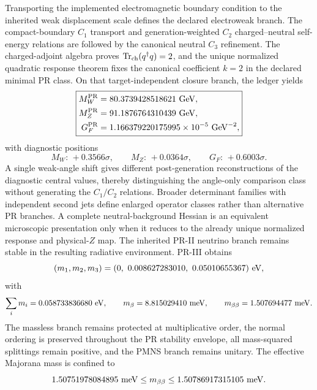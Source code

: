 \documentclass[11pt]{article}
\begin{document}
Transporting the implemented electromagnetic boundary condition to the
inherited weak displacement scale defines the declared electroweak branch.
The compact-boundary \(C_1\) transport and generation-weighted \(C_2\)
charged--neutral self-energy relations are followed by the canonical neutral
\(C_3\) refinement.  The charged-adjoint algebra proves
\(\operatorname{Tr}_{\rm ch}(q^\dagger q)=2\), and the unique normalized
quadratic response theorem fixes the canonical coefficient \(k=2\) in the
declared minimal PR class.  On that target-independent closure branch, the
ledger yields
\begin{equation}
\boxed{
\begin{aligned}
M_W^{\rm PR}
&=
80.3739428518621\ {\rm GeV},
\\
M_Z^{\rm PR}
&=
91.1876764310439\ {\rm GeV},
\\
G_F^{\rm PR}
&=
1.166379220175995\times10^{-5}\ {\rm GeV}^{-2},
\end{aligned}
}
\end{equation}
with diagnostic positions
\begin{equation}
M_W:\,+0.3566\sigma,
\qquad
M_Z:\,+0.0364\sigma,
\qquad
G_F:\,+0.6003\sigma .
\end{equation}
A single weak-angle shift gives different post-generation reconstructions of
the diagnostic central values, thereby distinguishing the angle-only
comparison class without generating the $C_1/C_2$ relations.  Broader
determinant families with independent second jets define enlarged operator
classes rather than alternative PR branches.  A complete neutral-background
Hessian is an equivalent microscopic presentation only when it reduces to the
already unique normalized response and physical-$Z$ map. The inherited PR-II neutrino branch remains stable in
the resulting radiative environment.  PR-III obtains
\begin{equation}
(m_1,m_2,m_3)
=
(0,\ 0.008627283010,\ 0.05010655367)\ {\rm eV},
\end{equation}
with
\begin{equation}
\sum_i m_i
=
0.058733836680\ {\rm eV},
\qquad
m_\beta
=
8.815029410\ {\rm meV},
\qquad
m_{\beta\beta}
=
1.507694477\ {\rm meV}.
\end{equation}
The massless branch remains protected at multiplicative order, the normal ordering is preserved throughout the PR stability envelope, all mass-squared splittings remain positive, and the PMNS branch remains unitary.  The effective Majorana mass is confined to
\begin{equation}
1.50751978084895\ {\rm meV}
\leq
m_{\beta\beta}
\leq
1.50786917315105\ {\rm meV}.
\end{equation}
\end{document}
